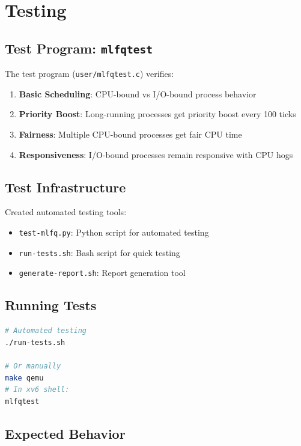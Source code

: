 \documentclass[11pt,a4paper]{article}
\begin{document}
\section{Testing}

\subsection{Test Program: \texttt{mlfqtest}}

The test program (\texttt{user/mlfqtest.c}) verifies:

\begin{enumerate}
    \item \textbf{Basic Scheduling}: CPU-bound vs I/O-bound process behavior
    \item \textbf{Priority Boost}: Long-running processes get priority boost every 100 ticks
    \item \textbf{Fairness}: Multiple CPU-bound processes get fair CPU time
    \item \textbf{Responsiveness}: I/O-bound processes remain responsive with CPU hogs
\end{enumerate}

\subsection{Test Infrastructure}

Created automated testing tools:
\begin{itemize}
    \item \texttt{test-mlfq.py}: Python script for automated testing
    \item \texttt{run-tests.sh}: Bash script for quick testing
    \item \texttt{generate-report.sh}: Report generation tool
\end{itemize}

\subsection{Running Tests}

\begin{lstlisting}[language=bash]
# Automated testing
./run-tests.sh

# Or manually
make qemu
# In xv6 shell:
mlfqtest
\end{lstlisting}

\subsection{Expected Behavior}
\end{document}
